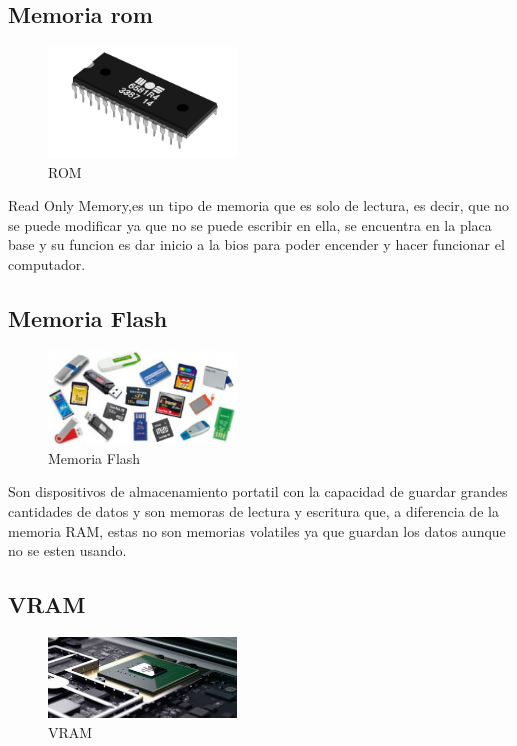 \documentclass{article}
\begin{document}
\subsection{Memoria rom}

\begin{figure}[h]
\includegraphics[width=5cm]{ROM.jpg}
\centering
\caption{ROM}
\label{fig:RAM}
\end{figure}

Read Only Memory,es un tipo de memoria que es solo de lectura, es decir, que no se puede modificar ya que no se puede escribir en ella, se encuentra en la placa base y su funcion es dar inicio a la bios para poder encender y hacer funcionar el computador.\cite{pagina2}

\subsection{Memoria Flash}

\begin{figure}[h]
\includegraphics[width=5cm]{FLASH.jpg}
\centering
\caption{Memoria Flash}
\label{fig:RAM}
\end{figure}

Son dispositivos de almacenamiento portatil con la capacidad de guardar grandes cantidades de datos y son memoras de lectura y escritura que, a diferencia de la memoria RAM, estas no son memorias volatiles ya que guardan los datos aunque no se esten usando.
\clearpage

\subsection{VRAM}

\begin{figure}[h]
\includegraphics[width=5cm]{VRAM.jpg}
\centering
\caption{VRAM}
\label{fig:RAM}
\end{figure}
\end{document}

